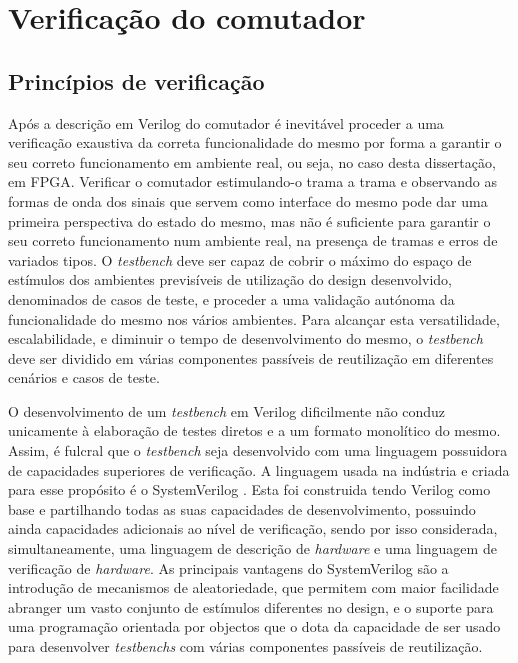\chapter{Verificação do comutador}

\section{Princípios de verificação}

Após a descrição em Verilog do comutador é inevitável proceder a uma verificação exaustiva da correta funcionalidade do mesmo por forma a garantir o seu correto funcionamento em ambiente real, ou seja, no caso desta dissertação, em FPGA. Verificar o comutador estimulando-o trama a trama e observando as formas de onda dos sinais que servem como interface do mesmo pode dar uma primeira perspectiva do estado do mesmo, mas não é suficiente para garantir o seu correto funcionamento num ambiente real, na presença de tramas e erros de variados tipos. O \textit{testbench} deve ser capaz de cobrir o máximo do espaço de estímulos dos ambientes previsíveis de utilização do design desenvolvido, denominados de casos de teste, e proceder a uma validação autónoma da funcionalidade do mesmo nos vários ambientes. Para alcançar esta versatilidade, escalabilidade, e diminuir o tempo de desenvolvimento do mesmo, o \textit{testbench} deve ser dividido em várias componentes passíveis de reutilização em diferentes cenários e casos de teste. \par
O desenvolvimento de um \textit{testbench} em Verilog dificilmente não conduz unicamente à elaboração de testes diretos e a um formato monolítico do mesmo. Assim, é fulcral que o \textit{testbench} seja desenvolvido com uma linguagem possuidora de capacidades superiores de verificação. A linguagem usada na indústria e criada para esse propósito é o SystemVerilog \cite{SV}. Esta foi construida tendo Verilog como base e partilhando todas as suas capacidades de desenvolvimento, possuindo ainda capacidades adicionais ao nível de verificação, sendo por isso considerada, simultaneamente, uma linguagem de descrição de \textit{hardware} e uma linguagem de verificação de \textit{hardware}. As principais vantagens do SystemVerilog são a introdução de mecanismos de aleatoriedade, que permitem com maior facilidade abranger um vasto conjunto de estímulos diferentes no design, e o suporte para uma programação orientada por objectos que o dota da capacidade de ser usado para desenvolver \textit{testbenchs} com várias componentes passíveis de reutilização.\par
